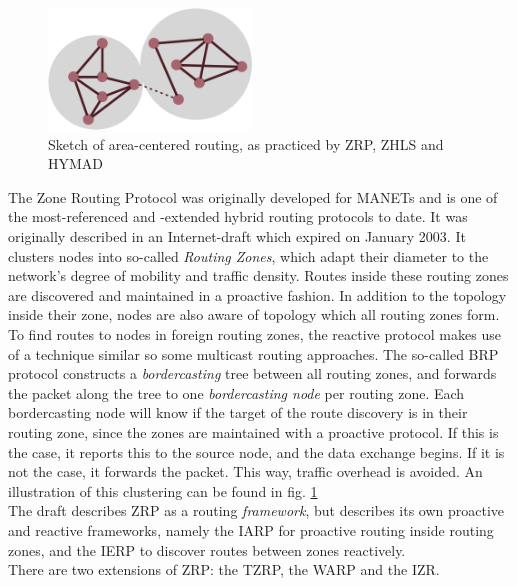 \documentclass[a4paper,10pt]{scrartcl}
\begin{document}
\begin{figure}
  \begin{center}
    \includegraphics[width=0.48\textwidth]{../images/ZRP}
  \end{center}
  \caption{Sketch of area-centered routing, as practiced by ZRP, ZHLS and HYMAD}
  \label{fig:area_centered}
\end{figure}

The Zone Routing Protocol was originally developed for \glspl{MANET} and is one of the most-referenced and -extended hybrid routing protocols to date. It was originally described in an Internet-draft which expired on January 2003\cite{ZRP-Draft}.
It clusters nodes into so-called \emph{Routing Zones}, which adapt their diameter to the network's degree of mobility and traffic density. Routes inside these routing zones are discovered and maintained in a proactive fashion. In addition to the topology inside their zone, nodes are also aware of topology which all routing zones form.
To find routes to nodes in foreign routing zones, the reactive protocol makes use of a technique similar so some multicast routing approaches. The so-called \gls{BRP}\cite{draft-ietf-manet-zone-brp} protocol constructs a \emph{bordercasting} tree between all routing zones, and forwards the packet along the tree to one \emph{bordercasting node} per routing zone. Each bordercasting node will know if the target of the route discovery is in their routing zone, since the zones are maintained with a proactive protocol. If this is the case, it reports this to the source node, and the data exchange begins. If it is not the case, it forwards the packet. This way, traffic overhead is avoided. An illustration of this clustering can be found in fig. \ref{fig:area_centered}\\
The draft describes ZRP as a routing \emph{framework}, but describes its own proactive and reactive frameworks, namely the \gls{IARP}\cite{draft-ietf-manet-zone-iarp} for proactive routing inside routing zones, and the \gls{IERP}\cite{draft-ietf-manet-zone-ierp} to discover routes between zones reactively.\\
There are two extensions of ZRP: the \gls{TZRP}\cite{TZRP}, the \gls{WARP}\cite{WARP}  and the \gls{IZR}\cite{IZR}. 
\end{document}
